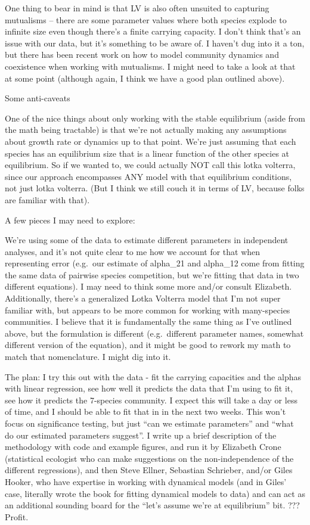\documentclass[
]{article}
\begin{document}
One thing to bear in mind is that LV is also often unsuited to capturing
mutualisms -- there are some parameter values where both species explode
to infinite size even though there's a finite carrying capacity. I don't
think that's an issue with our data, but it's something to be aware of.
I haven't dug into it a ton, but there has been recent work on how to
model community dynamics and coexistence when working with mutualisms. I
might need to take a look at that at some point (although again, I think
we have a good plan outlined above).

Some anti-caveats

One of the nice things about only working with the stable equilibrium
(aside from the math being tractable) is that we're not actually making
any assumptions about growth rate or dynamics up to that point. We're
just assuming that each species has an equilibrium size that is a linear
function of the other species at equilibrium. So if we wanted to, we
could actually NOT call this lotka volterra, since our approach
encompasses ANY model with that equilibrium conditions, not just lotka
volterra. (But I think we still couch it in terms of LV, because folks
are familiar with that).

A few pieces I may need to explore:

We're using some of the data to estimate different parameters in
independent analyses, and it's not quite clear to me how we account for
that when representing error (e.g.~our estimate of alpha\_21 and
alpha\_12 come from fitting the same data of pairwise species
competition, but we're fitting that data in two different equations). I
may need to think some more and/or consult Elizabeth. Additionally,
there's a generalized Lotka Volterra model that I'm not super familiar
with, but appears to be more common for working with many-species
communities. I believe that it is fundamentally the same thing as I've
outlined above, but the formulation is different (e.g.~different
parameter names, somewhat different version of the equation), and it
might be good to rework my math to match that nomenclature. I might dig
into it.

The plan: I try this out with the data - fit the carrying capacities and
the alphas with linear regression, see how well it predicts the data
that I'm using to fit it, see how it predicts the 7-species community. I
expect this will take a day or less of time, and I should be able to fit
that in in the next two weeks. This won't focus on significance testing,
but just ``can we estimate parameters'' and ``what do our estimated
parameters suggest''. I write up a brief description of the methodology
with code and example figures, and run it by Elizabeth Crone
(statistical ecologist who can make suggestions on the non-independence
of the different regressions), and then Steve Ellner, Sebastian
Schrieber, and/or Giles Hooker, who have expertise in working with
dynamical models (and in Giles' case, literally wrote the book for
fitting dynamical models to data) and can act as an additional sounding
board for the ``let's assume we're at equilibrium'' bit. ??? Profit.
\end{document}
